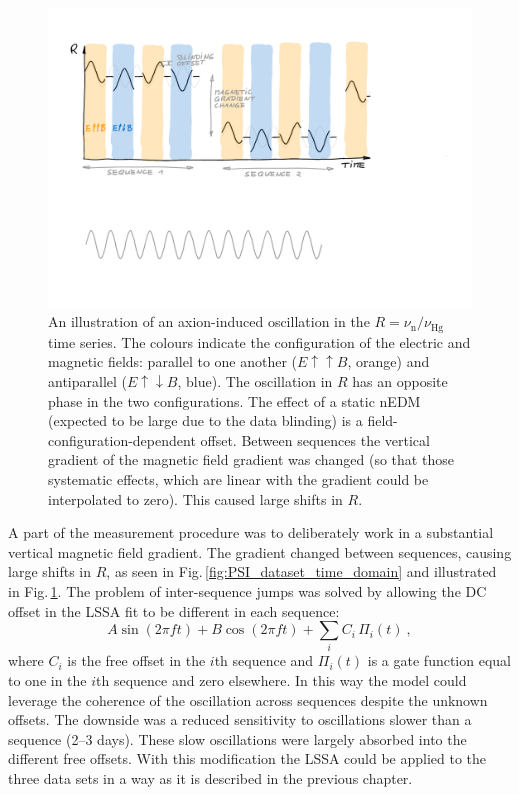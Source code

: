 \begin{figure}
  \centering
  \includegraphics[width=\linewidth]{gfx/axions/signal_illustration.pdf}
  \caption{An illustration of an axion-induced oscillation in the $R = \nu_\text{n} / \nu_\text{Hg}$ time series.
  The colours indicate the configuration of the electric and magnetic fields: parallel to one another ($E \uparrow \uparrow B$, orange) and antiparallel ($E \uparrow \downarrow B$, blue).
  The oscillation in $R$ has an opposite phase in the two configurations.
  The effect of a static nEDM (expected to be large due to the data blinding) is a field-configuration-dependent offset.
  Between sequences the vertical gradient of the magnetic field gradient was changed (so that those systematic effects, which are linear with the gradient could be interpolated to zero). This caused large shifts in $R$.}\label{fig:oscillating_nEDM_in_R}
\end{figure}

A part of the measurement procedure was to deliberately work in a substantial vertical magnetic field gradient.
The gradient changed between sequences, causing large shifts in $R$, as seen in Fig.\,\ref{fig:PSI_dataset_time_domain} and illustrated in Fig.\,\ref{fig:oscillating_nEDM_in_R}.
The problem of inter-sequence jumps was solved by allowing the DC offset in the LSSA fit to be different in each sequence:
\begin{equation}
  \label{eq:axions_LSSA}
  A\sin(2 \pi f t) + B\cos(2 \pi f t) + \sum_i C_i\,\Pi_i(t) \ ,
\end{equation}
where $C_i$ is the free offset in the $i$th sequence and $\Pi_i(t)$ is a gate function equal to one in the $i$th sequence and zero elsewhere.
In this way the model could leverage the coherence of the oscillation across sequences despite the unknown offsets.
The downside was a reduced sensitivity to oscillations slower than a sequence (2--3 days).
These slow oscillations were largely absorbed into the different free offsets.
With this modification the LSSA could be applied to the three data sets in a way as it is described in the previous chapter.

